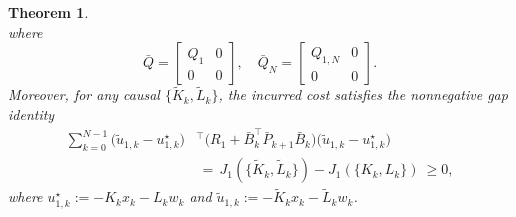 \documentclass[letterpaper, 10 pt, conference]{ieeeconf}  %
\newtheorem{theorem}{\textbf{Theorem}} %
\begin{document}
\begin{theorem}
\begin{equation}
\end{equation}
where
\begin{equation}\label{eq:Q-aug}
    \bar{Q} = \begin{bmatrix} Q_1 & 0 \\ 0 & 0 \end{bmatrix}, \quad \bar{Q}_N = \begin{bmatrix} Q_{1,N} & 0 \\ 0 & 0 \end{bmatrix}.
\end{equation}
Moreover, for any causal $\{\tilde K_k,\tilde L_k\}$, the incurred cost satisfies the nonnegative gap identity
\begin{equation}\label{eq:gap}
\begin{aligned}
\sum_{k=0}^{N-1}\!\big(\tilde u_{1,k}-u_{1,k}^\star\big)&^\top
\big(R_1+\bar B_k^\top \bar P_{k+1}\bar B_k\big)
\big(\tilde u_{1,k}-u_{1,k}^\star\big)\\
&\,=\,J_1(\{\tilde K_k,\tilde L_k\})-J_1(\{K_k,L_k\})\ \ge 0,
\end{aligned}
\end{equation}
where $u_{1,k}^\star:=-K_k x_k - L_k w_k$ and $\tilde u_{1,k}:=-\tilde K_k x_k - \tilde L_k w_k$.
\end{theorem}
\end{document}

